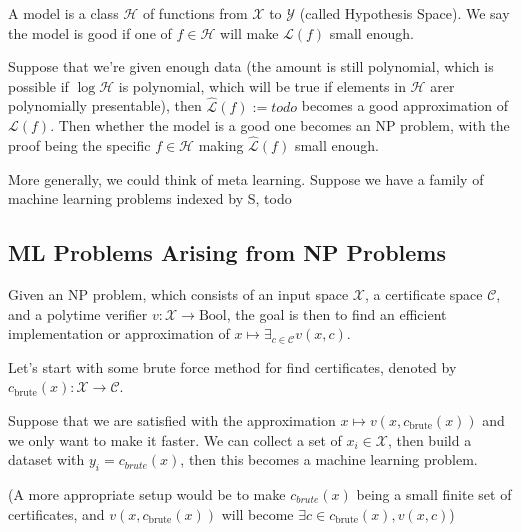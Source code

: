 \documentclass[9pt, oneside]{article}   	%
\theoremstyle{definition}
\begin{document}
A model is a class $\mathcal{H}$ of functions from $\mathcal{X}$ to $\mathcal{Y}$ (called Hypothesis Space). We say the model is good if one of $f\in \mathcal{H}$ will make $\mathscr{L}(f)$ small enough.

Suppose that we're given enough data (the amount is still polynomial, which is possible if $\log \mathcal{H}$ is polynomial, which will be true if elements in $\mathcal{H}$ arer polynomially presentable), then $\widehat{\mathscr{L}}(f):=todo$ becomes a good approximation of $\mathscr{L}(f)$. Then whether the model is a good one becomes an NP problem, with the proof being the specific $f\in \mathcal{H}$ making $\widehat{\mathscr{L}}(f)$ small enough.

More generally, we could think of meta learning. Suppose we have a family of machine learning problems indexed by S, todo
\subsection{ML Problems Arising from NP Problems}
\begin{center}
\end{center}

Given an NP problem, which consists of an input space $\mathcal{X}$, a certificate space $\mathcal{C}$, and a polytime verifier $v: \mathcal{X} \rightarrow \text{Bool}$, the goal is then to find an efficient implementation or approximation of $x\mapsto \exists_{c\in \mathcal{C}} v(x,c)$.

Let's start with some brute force method for find certificates, denoted by $c_{\text{brute}}(x): \mathcal{X} \to \mathcal{C}$.

Suppose that we are satisfied with the approximation $x\mapsto v(x,c_{\text{brute}}(x))$ and we only want to make it faster. We can collect a set of $x_i\in \mathcal{X}$, then build a dataset with $y_i=c_{brute}(x)$, then this becomes a machine learning problem.

(A more appropriate setup would be to make $c_{brute}(x)$ being a small finite set of certificates, and $v(x,c_{\text{brute}}(x))$ will become $\exists c\in c_{\text{brute}}(x), v(x, c)$)
\end{document}
